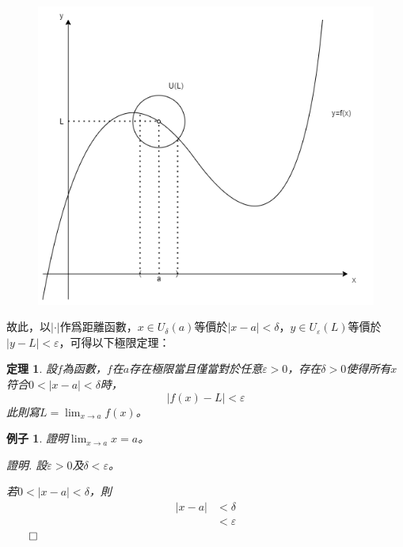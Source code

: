 \documentclass[12pt]{article}
\newtheorem*{theorem}{定理}
\newtheorem*{example}{例子}
\renewenvironment*{proof}{\textit{證明.}}{\hfill$\qed$}
\begin{document}
    \begin{figure}[H]
        \centering
        \includegraphics[scale=0.5]{epsilon-delta_limit.png}
    \end{figure}

    故此，以$|\cdot|$作爲距離函數，$x\in U_\delta(a)$等價於$|x-a|<\delta$，$y\in U_\varepsilon(L)$等價於$|y-L|<\varepsilon$，可得以下極限定理：

    \begin{theorem}
        設$f$為函數，$f$在$a$存在極限當且僅當對於任意$\varepsilon>0$，存在$\delta>0$使得所有$x$符合$0<|x-a|<\delta$時，$$|f(x)-L|<\varepsilon$$ 此則寫$L=\lim_{x\to a}f(x)$。
    \end{theorem}

    \begin{example}
        證明$\lim_{x\to a}x=a$。

        \begin{proof}
            設$\varepsilon>0$及$\delta<\varepsilon$。

            若$0<|x-a|<\delta$，則\begin{align*}
                |x-a|&<\delta\\
                &<\varepsilon
            \end{align*}
        \end{proof}
    \end{example}
\end{document}
